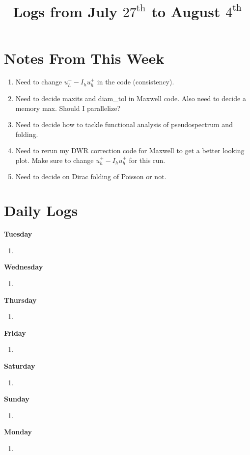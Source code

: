 \documentclass[12pt,a4paper]{article}
\title{Logs from July $27^{\text{th}}$ to August $4^{\text{th}}$}
\author{}
\date{}
\begin{document}
\maketitle

\section{Notes From This Week}

\begin{enumerate}
    \item Need to change $u_h^+ - I_h u_h^+$ in the code (consistency).
    \item Need to decide maxits and diam\_tol in Maxwell code. Also need to decide a memory max. Should I parallelize?
    \item Need to decide how to tackle functional analysis of pseudospectrum and folding.
    \item Need to rerun my DWR correction code for Maxwell to get a better looking plot. Make sure to change $u_h^+ - I_h u_h^+$ for this run. 
    \item Need to decide on Dirac folding of Poisson or not. 
\end{enumerate}


\section{Daily Logs}


\textbf{Tuesday}
\begin{enumerate}
\item
\end{enumerate}

\textbf{Wednesday}
\begin{enumerate}
\item  
\end{enumerate}

\textbf{Thursday}
\begin{enumerate}
   \item 
\end{enumerate}


\textbf{Friday}
\begin{enumerate}
   \item 
\end{enumerate}


\textbf{Saturday}
\begin{enumerate}
   \item 
\end{enumerate}

\textbf{Sunday}
\begin{enumerate}
   \item 
\end{enumerate}


\textbf{Monday}
\begin{enumerate}
   \item 
\end{enumerate}
\end{document}
